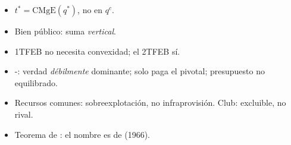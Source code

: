 \documentclass{article}
\begin{document}
\begin{columnas}
\begin{trampa}
\begin{itemize}
\item $t^*=\mathrm{CMgE}(q^*)$, no en $q^c$.
\item Bien público: suma \emph{vertical}.
\item 1TFEB no necesita convexidad; el 2TFEB sí.
\item {}-: verdad \emph{débilmente} dominante; solo paga el pivotal; presupuesto no equilibrado.
\item Recursos comunes: sobreexplotación, no infraprovisión. Club: excluible, no rival.
\item Teorema de : el nombre es de  (1966).
\end{itemize}
\end{trampa}

\end{columnas}
\end{document}
